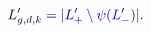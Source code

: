 \documentclass[12pt]{article}
\begin{document}
\makeatletter
\renewcommand*{\@textcolor}[3]{%
  \protect\leavevmode
  \begingroup
    \color#1{#2}#3%
  \endgroup
}
\makeatother
\begin{displaymath}
\mathcolor[RGB]{0,0,15}{L} _ { \mathcolor[RGB]{0,0,30}{g} \mathcolor[RGB]{0,0,45}{,} \mathcolor[RGB]{0,0,60}{d} \mathcolor[RGB]{0,0,75}{,} \mathcolor[RGB]{0,0,90}{k} } ^ { \mathcolor[RGB]{0,0,105}{\prime} } \mathcolor[RGB]{0,0,120}{=} \mathcolor[RGB]{0,0,135}{|} \mathcolor[RGB]{0,0,150}{L} _ { \mathcolor[RGB]{0,0,165}{+} } ^ { \mathcolor[RGB]{0,0,180}{\prime} } \mathcolor[RGB]{0,0,195}{\setminus} \mathcolor[RGB]{0,0,210}{\psi} \mathcolor[RGB]{0,0,225}{(} \mathcolor[RGB]{0,0,240}{L} _ { \mathcolor[RGB]{0,0,255}{-} } ^ { \mathcolor[RGB]{0,15,0}{\prime} } \mathcolor[RGB]{0,15,15}{)} \mathcolor[RGB]{0,15,30}{|} \mathcolor[RGB]{0,15,45}{.}
\end{displaymath}
\end{document}
